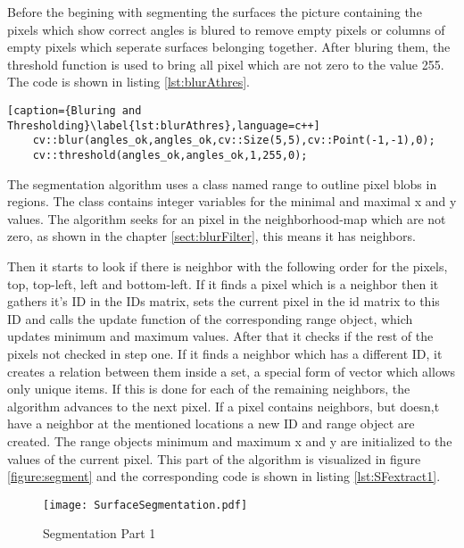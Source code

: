 Before the begining with segmenting the surfaces the picture containing the pixels which show correct angles
is blured to remove empty pixels or columns of empty pixels which seperate surfaces belonging together. After
bluring them, the threshold function is used to bring all pixel which are not zero to the value 255. 
The code is shown in listing \vref{lst:blurAthres}.

\begin{lstlisting}[caption={Bluring and Thresholding}\label{lst:blurAthres},language=c++]
	cv::blur(angles_ok,angles_ok,cv::Size(5,5),cv::Point(-1,-1),0);
	cv::threshold(angles_ok,angles_ok,1,255,0);
\end{lstlisting}

The segmentation algorithm uses a class named range to outline pixel blobs in regions. The class contains integer 
variables for the minimal and maximal x and y values. The algorithm seeks for an pixel in the 
neighborhood-map which are not zero, as shown in the chapter \vref{sect:blurFilter}, this means it has neighbors. 

Then it starts to look if there is neighbor with the following order for the pixels, top, top-left, left and bottom-left.
If it finds a pixel which is a neighbor then it gathers it's ID in the IDs matrix, sets the current pixel in the
id matrix to this ID and calls the update function of the corresponding range object, which updates minimum and
maximum values. After that it checks if the rest of the pixels not checked in step one. If it finds a neighbor
which has a different ID, it creates a relation between them inside a set, a special form of vector which allows
only unique items. If this is done for each of the remaining neighbors, the algorithm advances to the next pixel. 
If a pixel contains neighbors, but doesn,t have a neighbor at the mentioned locations a new ID and range object are 
created. The range objects minimum and maximum x and y are initialized to the values of the current pixel.
This part of the algorithm is visualized in figure \vref{figure:segment} and the corresponding code is shown in listing
\vref{lst:SFextract1}.

\begin{figure}[htp]
\begin{center}
  \texttt{[image: SurfaceSegmentation.pdf]}
  \caption{Segmentation Part 1}
  \label{figure:segment}
\end{center}
\end{figure}

